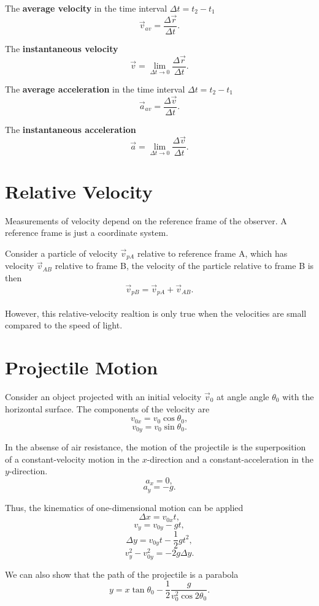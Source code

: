 \documentclass[11pt,a4paper]{report}
\begin{document}
\noindent
The \textbf{average velocity} in the time interval $\Delta{t} = t_2 - t_1$ $$\vec{v}_{av} = \frac{\Delta{\vec{r}}}{\Delta{t}}.$$

\noindent
The \textbf{instantaneous velocity} $$\vec{v} = \lim_{\Delta{t} \to 0} \frac{\Delta{\vec{r}}}{\Delta{t}}.$$

\noindent
The \textbf{average acceleration} in the time interval $\Delta{t} = t_2 - t_1$ $$\vec{a}_{av} = \frac{\Delta{\vec{v}}}{\Delta{t}}.$$

\noindent
The \textbf{instantaneous acceleration} $$\vec{a} = \lim_{\Delta{t} \to 0} \frac{\Delta{\vec{v}}}{\Delta{t}}.$$

\section*{Relative Velocity}

Measurements of velocity depend on the reference frame of the observer. A reference frame is just a coordinate system.

\noindent
Consider a particle of velocity $\vec{v}_{pA}$ relative to reference frame A, which has velocity $\vec{v}_{AB}$ relative to frame B, the velocity of the particle relative to frame B is then $$\vec{v}_{pB} = \vec{v}_{pA} + \vec{v}_{AB}.$$\\However, this relative-velocity realtion is only true when the velocities are small compared to the speed of light.
\section*{Projectile Motion}

Consider an object projected with an initial velocity $\vec{v}_0$ at angle angle $\theta_0$ with the horizontal surface. The components of the velocity are $$v_{0x} = v_0 \cos{\theta_0},$$ $$v_{0y} = v_0 \sin{\theta_0}.$$

\noindent
In the absense of air resistance, the motion of the projectile is the superposition of a constant-velocity motion in the $x$-direction and a constant-acceleration in the $y$-direction. $$a_x = 0,$$ $$a_y = -g.$$

\noindent
Thus, the kinematics of one-dimensional motion can be applied $$\Delta{x} = v_{0x} t,$$ $$v_y = v_{0y} - gt,$$ $$\Delta{y} = v_{0y} t - \frac{1}{2} gt^2,$$ $$v_y^2 - v_{0y}^2 = -2g \Delta{y}.$$

We can also show that the path of the projectile is a parabola $$y = x\tan{\theta_0} - \frac{1}{2} \frac{g}{v_0^2 \cos{2\theta_0}}.$$
\end{document}
